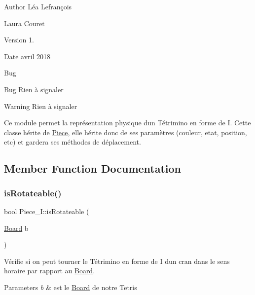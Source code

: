 \begin{DoxyAuthor}{Author}
Léa Lefrançois 

Laura Couret 
\end{DoxyAuthor}
\begin{DoxyVersion}{Version}
1. 
\end{DoxyVersion}
\begin{DoxyDate}{Date}
avril 2018 
\end{DoxyDate}
\begin{DoxyRefDesc}{Bug}
\item[\hyperlink{bug__bug000011}{Bug}]Rien à signaler \end{DoxyRefDesc}
\begin{DoxyWarning}{Warning}
Rien à signaler
\end{DoxyWarning}
Ce module permet la représentation physique d\textquotesingle{}un Tétrimino en forme de I. Cette classe hérite de \hyperlink{classPiece}{Piece}, elle hérite donc de ses paramètres (couleur, etat, position, etc) et gardera ses méthodes de déplacement. 

\subsection{Member Function Documentation}
\mbox{\label{classPiece__I_aec103ce64d2702bf3dc5dbcdb8b450eb}} 
\subsubsection{\texorpdfstring{is\+Rotateable()}{isRotateable()}}
{\footnotesize\ttfamily bool Piece\+\_\+\+I\+::is\+Rotateable (\begin{DoxyParamCaption}\item[{\hyperlink{classBoard}{Board}}]{b }\end{DoxyParamCaption})\hspace{0.3cm}{\ttfamily [virtual]}}



Vérifie si on peut tourner le Tétrimino en forme de I d\textquotesingle{}un cran dans le sens horaire par rapport au \hyperlink{classBoard}{Board}. 


\begin{DoxyParams}{Parameters}
{\em b} & est le \hyperlink{classBoard}{Board} de notre Tetris \\
\hline
\end{DoxyParams}


